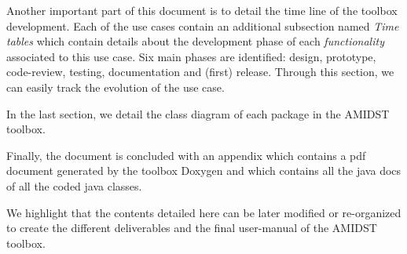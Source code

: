 \documentclass[11pt, oneside]{article}   	%
\begin{document}
Another important part of this document is to detail the time line of the toolbox development. Each of the use cases contain an additional subsection named \textit{Time tables} which contain details about the development phase of each \textit{functionality} associated to this use case. Six main phases are identified: design, prototype, code-review, testing, documentation and (first) release. Through this section, we can easily track the evolution of the use case.

In the last section, we detail the class diagram of each package in the AMIDST toolbox. 

Finally, the document is concluded with an appendix which contains a pdf document generated by the toolbox Doxygen and which contains all the java docs of all the coded java classes. 

We highlight that the contents detailed here can be later modified or re-organized to create the different deliverables and the final user-manual of the AMIDST toolbox. 
 
\newpage






























\end{document}
